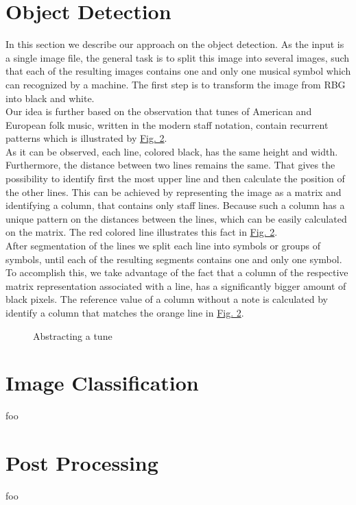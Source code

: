\documentclass{llncs}
\begin{document}
\section{Object Detection}
In this section we describe our approach on the object detection. As the input is a single image file, the general task is to split this image into several images, such that each of the resulting images contains one and only one musical symbol which can recognized by a machine. The first step is to transform the image from RBG into black and white. \\
Our idea is further based on the observation that tunes of American and European folk music, written in the modern staff notation, contain recurrent patterns which is illustrated by \hyperref[object_detection]{Fig. 2}. \\
As it can be observed, each line, colored black, has the same height and width. Furthermore, the distance between two lines remains the same. That gives the possibility to identify first the most upper line and then calculate the position of the other lines. This can be achieved by representing the image as a matrix and identifying a column, that contains only staff lines. Because such a column has a unique pattern on the distances between the lines, which can be easily calculated on the matrix. The red colored line illustrates this fact in \hyperref[object_detection]{Fig. 2}. \\
After segmentation of the lines we split each line into symbols or groups of symbols, until each of the resulting segments contains one and only one symbol. To accomplish this, we take advantage of the fact that a column of the respective matrix representation associated with a line, has a significantly bigger amount of black pixels. The reference value of a column without a note is calculated by identify a column that matches the orange line in  \hyperref[object_detection]{Fig. 2}.  \\




\begin{figure}
 
 \caption{Abstracting a tune} 
 \label{object_detection}
\end{figure}


\section{Image Classification}
foo

\section{Post Processing}
foo

\newpage 


  
\end{document}
